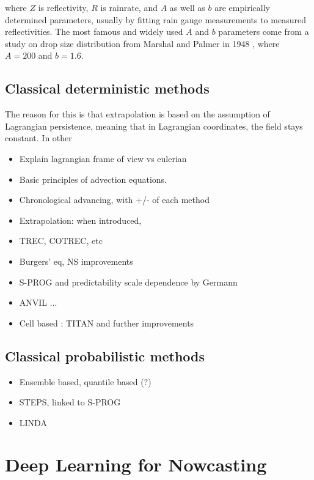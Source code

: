 where $Z$ is reflectivity, $R$ is rainrate, and $A$ as well as $b$ are empirically determined parameters, usually by fitting rain gauge measurements to measured reflectivities. The most famous and widely used $A$ and $b$ parameters come from a study on drop size distribution from Marshal and Palmer in 1948 \cite{marshall1948size}, where $A=200$ and $b=1.6$.


\subsection{Classical deterministic methods}
\label{section:classic_nowcast}

The reason for this is that extrapolation is based on the assumption of Lagrangian persistence, meaning that in Lagrangian coordinates, the field stays constant. In other 

\begin{itemize}
	\item Explain lagrangian frame of view vs eulerian
	\item Basic principles of advection equations. 
	\item Chronological advancing, with +/- of each method
	\item Extrapolation: when introduced,
	\item TREC, COTREC, etc
	\item Burgers' eq, NS improvements 
	\item S-PROG and predictability scale dependence by Germann
	\item ANVIL ...
	\item Cell based : TITAN and further improvements
\end{itemize}



\subsection{Classical probabilistic methods}
\begin{itemize}
	\item Ensemble based, quantile based (?)
	\item STEPS, linked to S-PROG
	\item LINDA 
\end{itemize}



\section{Deep Learning for Nowcasting}

